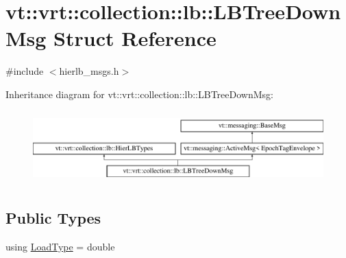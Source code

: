 \hypertarget{structvt_1_1vrt_1_1collection_1_1lb_1_1_l_b_tree_down_msg}{}\section{vt\+:\+:vrt\+:\+:collection\+:\+:lb\+:\+:L\+B\+Tree\+Down\+Msg Struct Reference}
\label{structvt_1_1vrt_1_1collection_1_1lb_1_1_l_b_tree_down_msg}


{\ttfamily \#include $<$hierlb\+\_\+msgs.\+h$>$}

Inheritance diagram for vt\+:\+:vrt\+:\+:collection\+:\+:lb\+:\+:L\+B\+Tree\+Down\+Msg\+:\begin{figure}[H]
\begin{center}
\leavevmode
\includegraphics[height=2.847458cm]{structvt_1_1vrt_1_1collection_1_1lb_1_1_l_b_tree_down_msg}
\end{center}
\end{figure}
\subsection*{Public Types}
\begin{DoxyCompactItemize}
\item 
using \hyperlink{structvt_1_1vrt_1_1collection_1_1lb_1_1_l_b_tree_down_msg_a7027506c735fa124564be187c5e6fb5d}{Load\+Type} = double
\end{DoxyCompactItemize}
